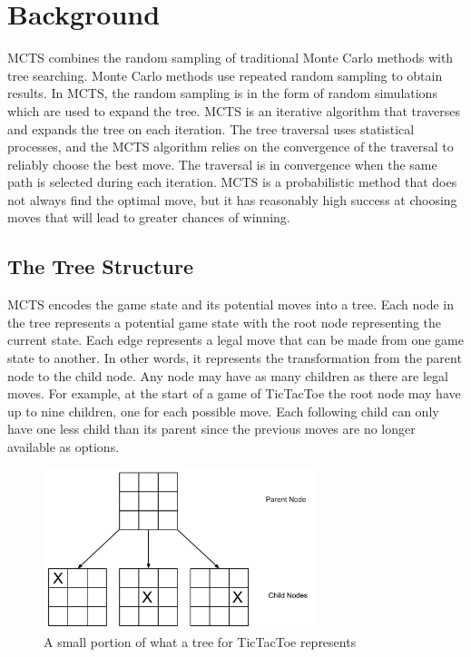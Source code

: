 \documentclass{sig-alternate}
\begin{document}
\section{Background}
MCTS combines the random sampling of traditional Monte Carlo methods with tree searching. Monte Carlo methods use repeated random sampling to obtain results. In MCTS, the random sampling is in the form of random simulations which are used to expand the tree. MCTS is an iterative algorithm that traverses and expands the tree on each iteration. The tree traversal uses statistical processes, and the MCTS algorithm relies on the convergence of the traversal to reliably choose the best move. The traversal is in convergence when the same path is selected during each iteration. MCTS is a probabilistic method that does not always find the optimal move, but it has reasonably high success at choosing moves that will lead to greater chances of winning.
\subsection{The Tree Structure}\label{sec:TreeStructure}


MCTS encodes the game state and its potential moves into a tree. Each node in the tree represents a potential game state with the root node representing the current state. Each edge represents a legal move that can be made from one game state to another. In other words, it represents the transformation from the parent node to the child node. Any node may have as many children as there are legal moves. For example, at the start of a game of TicTacToe the root node may have up to nine children, one for each possible move. Each following child can only have one less child than its parent since the previous moves are no longer available as options.

\begin{figure}[h]
\includegraphics[width=8cm]{TicTacToeTree.pdf}
\centering
\caption{A small portion of what a tree for TicTacToe represents}
\label{fig:TicTacToe}
\end{figure}
\end{document}
